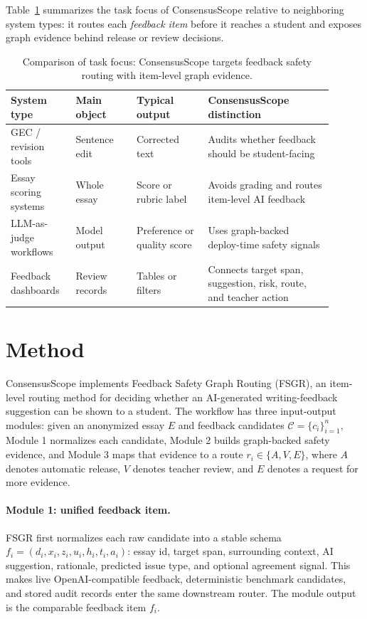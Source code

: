 \documentclass[11pt]{article}
\begin{document}
Table~\ref{tab:comparison} summarizes the task focus of ConsensusScope relative
to neighboring system types: it routes each \emph{feedback item} before it
reaches a student and exposes graph evidence behind release or review decisions.

\begin{table}[t]
\centering
\small
\setlength{\tabcolsep}{4pt}
\begin{tabular}{@{}p{0.18\linewidth}p{0.17\linewidth}p{0.20\linewidth}p{0.35\linewidth}@{}}
\toprule
System type & Main object & Typical output & ConsensusScope distinction \\
\midrule
GEC / revision tools & Sentence edit & Corrected text & Audits whether feedback should be student-facing \\
Essay scoring systems & Whole essay & Score or rubric label & Avoids grading and routes item-level AI feedback \\
LLM-as-judge workflows & Model output & Preference or quality score & Uses graph-backed deploy-time safety signals \\
Feedback dashboards & Review records & Tables or filters & Connects target span, suggestion, risk, route, and teacher action \\
\bottomrule
\end{tabular}
\caption{Comparison of task focus: ConsensusScope targets feedback safety
routing with item-level graph evidence.}
\label{tab:comparison}
\end{table}


\section{Method}

ConsensusScope implements Feedback Safety Graph Routing (FSGR), an item-level
routing method for deciding whether an AI-generated writing-feedback suggestion
can be shown to a student. The workflow has three input-output modules: given
an anonymized essay $E$ and feedback candidates $\mathcal{C}=\{c_i\}_{i=1}^{n}$,
Module 1 normalizes each candidate, Module 2 builds graph-backed safety
evidence, and Module 3 maps that evidence to a route
$r_i\in\{A,V,E\}$, where $A$ denotes automatic release, $V$ denotes teacher
review, and $E$ denotes a request for more evidence.

\paragraph{Module 1: unified feedback item.}
FSGR first normalizes each raw candidate into a stable schema
$f_i=(d_i,x_i,z_i,u_i,h_i,t_i,a_i)$: essay id, target span, surrounding context,
AI suggestion, rationale, predicted issue type, and optional agreement signal.
This makes live OpenAI-compatible feedback, deterministic benchmark candidates,
and stored audit records enter the same downstream router. The module output is
the comparable feedback item $f_i$.
\end{document}

